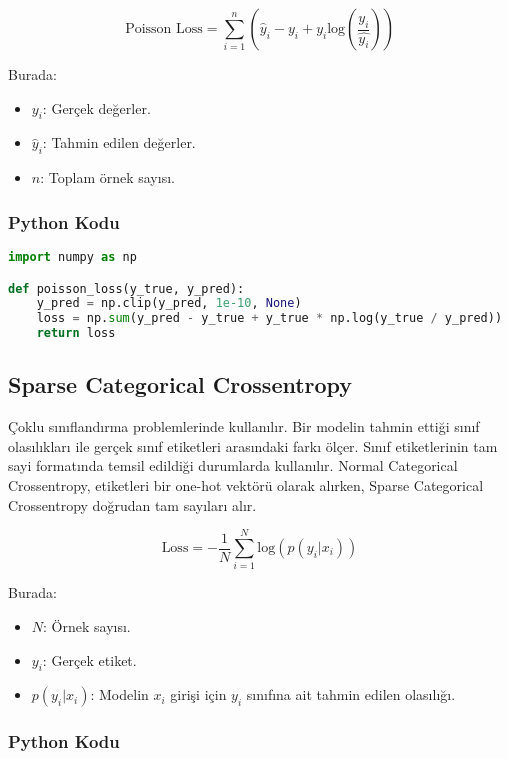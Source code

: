 \[ \text{Poisson Loss} = \sum_{i=1}^{n} (\hat{y}_i - y_i + y_i \text{log}(\frac{y_i}{\hat{y_i}})) \]

Burada:

\begin{itemize}
    \item $y_i$: Gerçek değerler.
    \item $\hat{y}_i$: Tahmin edilen değerler.
    \item $n$: Toplam örnek sayısı.
\end{itemize}

\subsubsection{Python Kodu}

\begin{lstlisting}[language=Python]
import numpy as np

def poisson_loss(y_true, y_pred):
    y_pred = np.clip(y_pred, 1e-10, None)
    loss = np.sum(y_pred - y_true + y_true * np.log(y_true / y_pred))
    return loss
\end{lstlisting}

\newpage

\subsection{Sparse Categorical Crossentropy}

Çoklu sınıflandırma problemlerinde kullanılır. Bir modelin tahmin ettiği sınıf olasılıkları ile gerçek sınıf etiketleri arasındaki farkı ölçer. Sınıf etiketlerinin tam sayi formatında temsil edildiği durumlarda kullanılır. Normal Categorical Crossentropy, etiketleri bir one-hot vektörü olarak alırken, Sparse Categorical Crossentropy doğrudan tam sayıları alır.

\[ \text{Loss} = - \frac{1}{N} \sum_{i=1}^{N} \text{log}(p(y_i | x_i)) \]

Burada:

\begin{itemize}
    \item $N$: Örnek sayısı.
    \item $y_i$: Gerçek etiket.
    \item $p(y_i | x_i)$: Modelin $x_i$ girişi için $y_i$ sınıfına ait tahmin edilen olasılığı.
\end{itemize}

\subsubsection{Python Kodu}

